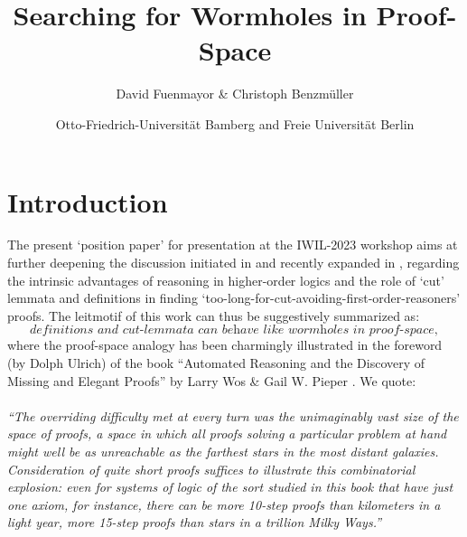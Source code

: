 \documentclass{article}
\title{Searching for Wormholes in Proof-Space}
\author{David Fuenmayor \& Christoph Benzmüller}
\date{\normalsize Otto-Friedrich-Universität Bamberg and Freie Universität Berlin}
\begin{document}
\maketitle

\section{Introduction}

The present `position paper' for presentation at the IWIL-2023 workshop aims at further deepening the discussion initiated in \cite{LostProof} and recently expanded in \cite{BCPpaper}, regarding the intrinsic advantages of reasoning in higher-order logics and the role of `cut' lemmata and definitions in finding `too-long-for-cut-avoiding-first-order-reasoners' proofs.
The leitmotif of this work can thus be suggestively summarized as:
$$\textit{definitions and cut-lemmata can behave like wormholes in proof-space},$$
where the proof-space analogy has been charmingly illustrated in the foreword (by Dolph Ulrich) of the book ``Automated Reasoning and the Discovery of Missing and Elegant Proofs'' by Larry Wos \& Gail W. Pieper \cite{wos2003automated}. We quote: 
\\ \\
\textit{``The overriding difficulty met at every turn was the unimaginably vast size of the space of proofs, a space in which all proofs solving a particular problem at hand might well be as unreachable as the farthest stars in the most distant galaxies. Consideration of quite short proofs suffices to illustrate this combinatorial explosion: even for systems of logic of the sort studied in this book that have just one axiom, for instance, there can be more 10-step proofs than kilometers in a light year, more 15-step proofs than stars in a trillion Milky Ways.''}
\\
\end{document}
